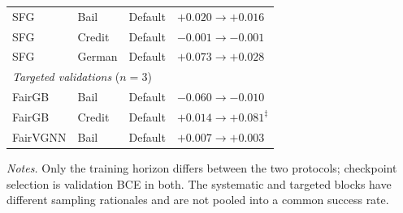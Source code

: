 \begin{table}[t]
\begin{tabular}{llll}
SFG & Bail & Default
& \(+0.020 \rightarrow +0.016\) \\
SFG & Credit & Default
& \(-0.001 \rightarrow -0.001\) \\
SFG & German & Default
& \(+0.073 \rightarrow +0.028\) \\

\midrule
\multicolumn{4}{l}{\textit{Targeted validations} (\(n=3\))} \\
\addlinespace[1pt]

FairGB & Bail & Default
& \(-0.060 \rightarrow -0.010\) \\
FairGB & Credit & Default
& \(+0.014 \rightarrow \mathbf{+0.081}^{\ddagger}\) \\
FairVGNN & Bail & Default
& \(+0.007 \rightarrow +0.003\) \\

\bottomrule
\end{tabular}

\vspace{2pt}
\begin{minipage}{0.94\textwidth}
\footnotesize
\vspace{0.2cm}
\textit{Notes.}
Only the training horizon differs between the two protocols; checkpoint selection is validation BCE in both.
The systematic and targeted blocks have different sampling rationales and are not pooled into a common success rate.
\end{minipage}
\end{table}
